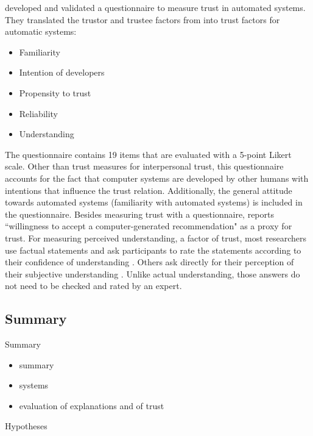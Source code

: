 \cite{korber2018theoretical} developed and validated a questionnaire to measure trust in automated systems. They translated the trustor and trustee factors from \cite{mayer1995integrative} into trust factors for automatic systems:
\begin{itemize}
	\item Familiarity
	\item Intention of developers
	\item Propensity to trust
	\item Reliability
	\item Understanding
\end{itemize}
The questionnaire contains 19 items that are evaluated with a 5-point Likert scale. Other than trust measures for interpersonal trust, this questionnaire accounts for the fact that computer systems are developed by other humans with intentions that influence the trust relation. Additionally, the general attitude towards automated systems (familiarity with automated systems) is included in the questionnaire.\newline
Besides measuring trust with a questionnaire, \cite{vorm2018assessing} reports ``willingness to accept a computer-generated recommendation" as a proxy for trust.\newline
For measuring perceived understanding, a factor of trust, most researchers use factual statements and ask participants to rate the statements according to their confidence of understanding \cite{ball2015development, broadbent2006brief}. Others ask directly for their perception of their subjective understanding \cite{joffe2001quality, racine2018participants, van2001perceived, zamalia2016students}. Unlike actual understanding, those answers do not need to be checked and rated by an expert.






\subsection{Summary}
Summary\newline
\begin{itemize}
	\item summary 
	\item systems
	\item evaluation of explanations and of trust
\end{itemize}
Hypotheses













